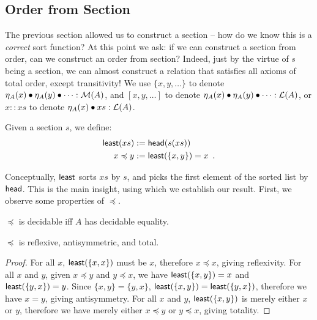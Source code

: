 \subsection{Order from Section}

The previous section allowed us to construct a section -- how do we know this is a \emph{correct} sort function?
%
At this point we ask: if we can construct a section from order, can we construct an order from section?
%
Indeed, just by the virtue of $s$ being a section, we can almost construct a relation that satisfies
all axioms of total order, except transitivity!
We use $\{x,y,\dots\}$ to denote $\eta_A(x) \mathbin{\bullet} \eta_A(y) \mathbin{\bullet} \dots : \mathcal{M}(A)$,
and $[x, y, \dots]$ to denote $\eta_A(x) \mathbin{\bullet} \eta_A(y) \mathbin{\bullet} \dots : \mathcal{L}(A)$,
or $x :: xs$ to denote $\eta_A(x) \mathbin{\bullet} xs : \mathcal{L}(A)$.

\begin{definition}
    \label{def:least}
    Given a section $s$, we define:
    \[
        \begin{aligned}
            \operatorname{\mathsf{least}}(xs) & := \operatorname{\mathsf{head}}(s(xs))                    \\
            x \preccurlyeq y & := \operatorname{\mathsf{least}}(\{x, y\}) = x \enspace .
        \end{aligned}
    \]
\end{definition}

Conceptually, $\operatorname{\mathsf{least}}$ sorts $xs$ by $s$, and picks the first element of the sorted list by~$\operatorname{\mathsf{head}}$.
This is the main insight, using which we establish our result.
First, we observe some properties of $\preccurlyeq$.

\begin{proposition}
    $\preccurlyeq$ is decidable iff $A$ has decidable equality.
\end{proposition}

\begin{proposition}\label{sort:almost-total}
    $\preccurlyeq$ is reflexive, antisymmetric, and total.
\end{proposition}
\begin{proof}
    For all $x$, $\operatorname{\mathsf{least}}(\{x, x\})$ must be $x$, therefore $x \preccurlyeq x$, giving reflexivity.
    For all $x$ and $y$, given $x \preccurlyeq y$ and $y \preccurlyeq x$,
    we have $\operatorname{\mathsf{least}}(\{x, y\}) = x$ and $\operatorname{\mathsf{least}}(\{y, x\}) = y$.
    Since $\{x, y\} = \{y, x\}$, $\operatorname{\mathsf{least}}(\{x, y\}) = \operatorname{\mathsf{least}}(\{y, x\})$,
    therefore we have $x = y$, giving antisymmetry.
    For all $x$ and $y$, $\operatorname{\mathsf{least}}(\{x, y\})$ is merely either $x$ or $y$,
    therefore we have merely either $x \preccurlyeq y$ or $y \preccurlyeq x$, giving totality.
\end{proof}


